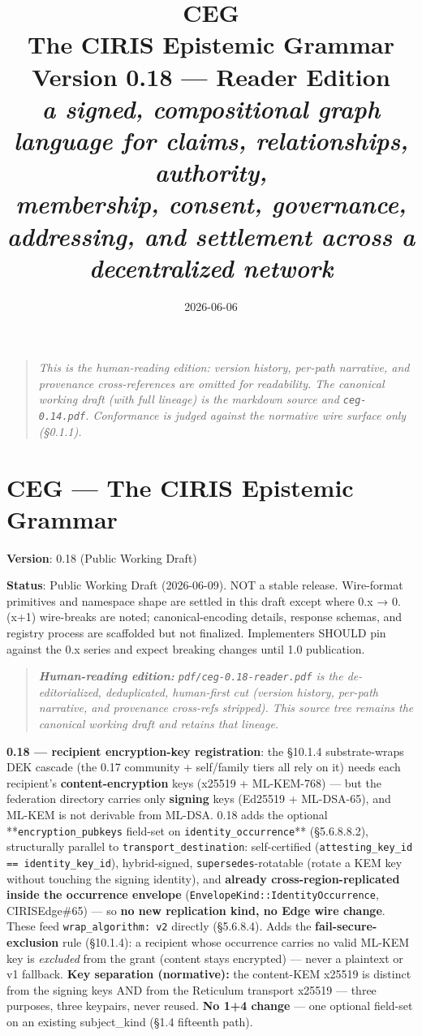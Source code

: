 \documentclass[11pt]{article}
\title{\vspace{-1cm}\Huge\bfseries\color{accent}CEG\\[6pt]\LARGE The CIRIS Epistemic Grammar\\[14pt]
\normalsize\mdseries Version 0.18 --- Reader Edition\\[2pt]
\itshape a signed, compositional graph language for claims, relationships, authority,\\
membership, consent, governance, addressing, and settlement across a decentralized network}
\author{}\date{2026-06-06}
\begin{document}
\maketitle\thispagestyle{empty}
\begin{quote}\itshape This is the human-reading edition: version history, per-path narrative, and
provenance cross-references are omitted for readability. The canonical working draft
(with full lineage) is the markdown source and \texttt{ceg-0.14.pdf}. Conformance is
judged against the normative wire surface only (\S0.1.1).\end{quote}
\clearpage
\tableofcontents
\clearpage

\section*{CEG — The CIRIS Epistemic Grammar}


\textbf{Version}: 0.18 (Public Working Draft)

\textbf{Status}: Public Working Draft (2026-06-09). NOT a stable release. Wire-format primitives and namespace shape are settled in this draft except where 0.x → 0.(x+1) wire-breaks are noted; canonical-encoding details, response schemas, and registry process are scaffolded but not finalized. Implementers SHOULD pin against the 0.x series and expect breaking changes until 1.0 publication.


\begin{quote}\itshape \textbf{Human-reading edition:} \texttt{pdf/ceg-0.18-reader.pdf} is the de-editorialized, deduplicated, human-first cut (version history, per-path narrative, and provenance cross-refs stripped). This source tree remains the canonical working draft and retains that lineage.\end{quote}


\textbf{0.18 — recipient encryption-key registration}: the §10.1.4 substrate-wraps DEK cascade (the 0.17 community + self/family tiers all rely on it) needs each recipient's \textbf{content-encryption} keys (x25519 + ML-KEM-768) — but the federation directory carries only \textbf{signing} keys (Ed25519 + ML-DSA-65), and ML-KEM is not derivable from ML-DSA. 0.18 adds the optional **\texttt{encryption\_pubkeys} field-set on \texttt{identity\_occurrence}** (§5.6.8.8.2), structurally parallel to \texttt{transport\_destination}: self-certified (\texttt{attesting\_key\_id == identity\_key\_id}), hybrid-signed, \texttt{supersedes}-rotatable (rotate a KEM key without touching the signing identity), and \textbf{already cross-region-replicated inside the occurrence envelope} (\texttt{EnvelopeKind::IdentityOccurrence}, CIRISEdge\#65) — so \textbf{no new replication kind, no Edge wire change}. These feed \texttt{wrap\_algorithm: v2} directly (§5.6.8.4). Adds the \textbf{fail-secure-exclusion} rule (§10.1.4): a recipient whose occurrence carries no valid ML-KEM key is \textit{excluded} from the grant (content stays encrypted) — never a plaintext or v1 fallback. \textbf{Key separation (normative):} the content-KEM x25519 is distinct from the signing keys AND from the Reticulum transport x25519 — three purposes, three keypairs, never reused. \textbf{No 1+4 change} — one optional field-set on an existing subject\_kind (§1.4 fifteenth path).
\end{document}
